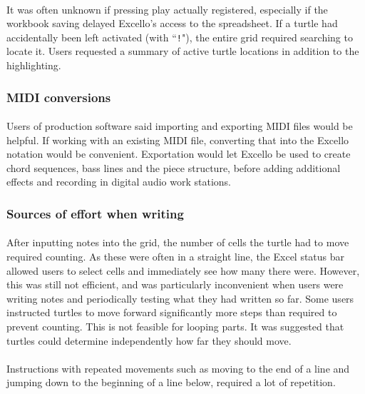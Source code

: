 \paragraph{} It was often unknown if pressing play actually registered, especially if the workbook saving delayed Excello's access to the spreadsheet. If a turtle had accidentally been left activated (with ``\texttt{!}"), the entire grid required searching to locate it. Users requested a summary of active turtle locations in addition to the highlighting.

\subsubsection{MIDI conversions}

\paragraph{} Users of production software said importing and exporting MIDI files would be helpful. If working with an existing MIDI file, converting that into the Excello notation would be convenient. Exportation would let Excello be used to create chord sequences, bass lines and the piece structure, before adding additional effects and recording in digital audio work stations.

\subsubsection{Sources of effort when writing}

\paragraph{} After inputting notes into the grid, the number of cells the turtle had to move required counting. As these were often in a straight line, the Excel status bar allowed users to select cells and immediately see how many there were. However, this was still not efficient, and was particularly inconvenient when users were writing notes and periodically testing what they had written so far. Some users instructed turtles to move forward significantly more steps than required to prevent counting. This is not feasible for looping parts. It was suggested that turtles could determine independently how far they should move.

\paragraph{} Instructions with repeated movements such as moving to the end of a line and jumping down to the beginning of a line below, required a lot of repetition.

